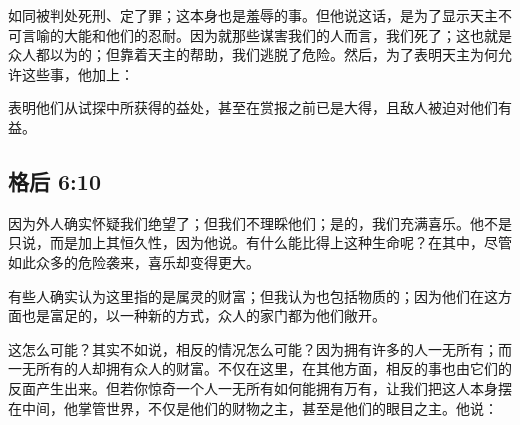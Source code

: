\par

如同被判处死刑、定了罪；这本身也是羞辱的事。但他说这话，是为了显示天主不可言喻的大能和他们的忍耐。因为就那些谋害我们的人而言，我们死了；这也就是众人都以为的；但靠着天主的帮助，我们逃脱了危险。然后，为了表明天主为何允许这些事，他加上：\par

表明他们从试探中所获得的益处，甚至在赏报之前已是大得，且敌人被迫对他们有益。\par


\subsection{格后 6:10}

\par

因为外人确实怀疑我们绝望了；但我们不理睬他们；是的，我们充满喜乐。他不是只说，而是加上其恒久性，因为他说。有什么能比得上这种生命呢？在其中，尽管如此众多的危险袭来，喜乐却变得更大。\par

\par

有些人确实认为这里指的是属灵的财富；但我认为也包括物质的；因为他们在这方面也是富足的，以一种新的方式，众人的家门都为他们敞开。\par

\par

这怎么可能？其实不如说，相反的情况怎么可能？因为拥有许多的人一无所有；而一无所有的人却拥有众人的财富。不仅在这里，在其他方面，相反的事也由它们的反面产生出来。但若你惊奇一个人一无所有如何能拥有万有，让我们把这人本身摆在中间，他掌管世界，不仅是他们的财物之主，甚至是他们的眼目之主。他说：\par

